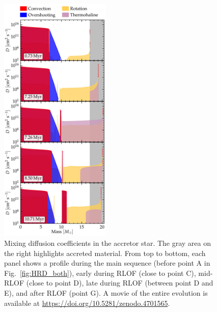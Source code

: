 \documentclass[twocolumn,twocolappendix,trackchanges]{aastex63}
\DeclareRobustCommand{\Figref}[1]{Fig.~\ref{#1}}
\begin{document}
\begin{figure}[htbp]
  \includegraphics[width=0.47\textwidth]{D_mix_vertical}
  \caption{Mixing diffusion coefficients in the accretor star. The
    gray area on the right highlights accreted material. From
    top to bottom, each panel shows a profile during the main sequence
    (before point A in \Figref{fig:HRD_both}),
    early during RLOF (close to point C), mid-RLOF (close to
    point D), late during RLOF (between point D and E), and after RLOF
    (point G). A movie of the entire evolution is available at \url{https://doi.org/10.5281/zenodo.4701565}.}
  \label{fig:D_mix}
\end{figure}
\end{document}
